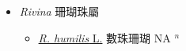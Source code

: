 
  \begin{itemize}
 \item[] \textit{Rivina} 珊瑚珠屬
                    
  \begin{itemize}
        \item[] \href{http://www.theplantlist.org/tpl1.1/search?q=Rivina+humilis}{\textit{R. humilis} L.}   數珠珊瑚 NA $^n$
  \end{itemize}
  \end{itemize}
